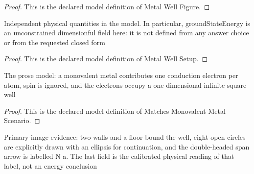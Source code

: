 \begin{proof}
  This is the declared model definition of Metal Well Figure.
\end{proof}
\begin{definition}
  \label{def:physics:phyx-mini-0603:phyxminiproblems-problemphyxmini0603-metalwellsetup}
  Independent physical quantities in the model. In particular, groundStateEnergy is an unconstrained dimensionful field here: it is not defined from any answer choice or from the requested closed form
\end{definition}
\begin{proof}
  This is the declared model definition of Metal Well Setup.
\end{proof}
\begin{definition}
  \label{def:physics:phyx-mini-0603:phyxminiproblems-problemphyxmini0603-matchesmonovalentmetalscenario}
  The prose model: a monovalent metal contributes one conduction electron per atom, spin is ignored, and the electrons occupy a one-dimensional infinite square well
\end{definition}
\begin{proof}
  This is the declared model definition of Matches Monovalent Metal Scenario.
\end{proof}
\begin{definition}
  \label{def:physics:phyx-mini-0603:phyxminiproblems-problemphyxmini0603-matchessuppliedmetalwellfigure}
  Primary-image evidence: two walls and a floor bound the well, eight open circles are explicitly drawn with an ellipsis for continuation, and the double-headed span arrow is labelled N a. The last field is the calibrated physical reading of that label, not an energy conclusion
\end{definition}
